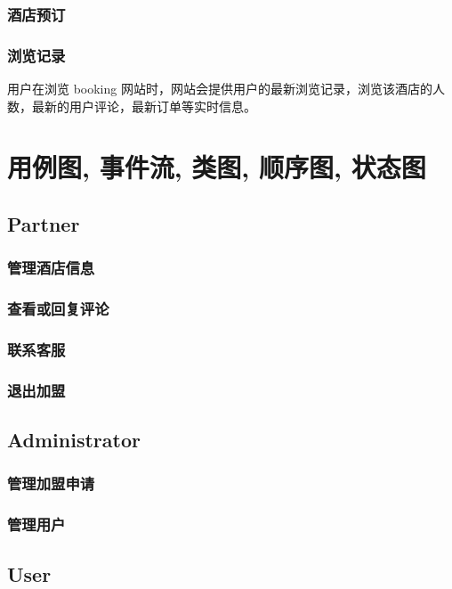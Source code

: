 \documentclass[11pt]{article}
\begin{document}
		\subsubsection{酒店预订}
			
		
		\subsubsection{浏览记录}
		用户在浏览 booking 网站时，网站会提供用户的最新浏览记录，浏览该酒店的人数，最新的用户评论，最新订单等实时信息。
		

\section{用例图, 事件流, 类图, 顺序图, 状态图}
	\subsection{Partner}
		\subsubsection{管理酒店信息}
		\subsubsection{查看或回复评论}
		\subsubsection{联系客服}
		\subsubsection{退出加盟}
		
	\subsection{Administrator}
		\subsubsection{管理加盟申请}
		\subsubsection{管理用户}
		
		
	
	\subsection{User}
	
\end{document}
